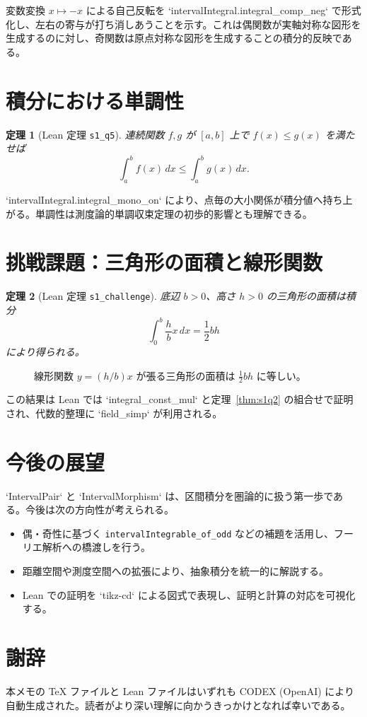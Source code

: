 \documentclass[luatex]{ltjsarticle}
\theoremstyle{definition}
\theoremstyle{plain}
\newtheorem{theorem}{定理}
\theoremstyle{remark}
\begin{document}
変数変換 \(x\mapsto -x\) による自己反転を `intervalIntegral.integral_comp_neg` で形式化し、左右の寄与が打ち消しあうことを示す。これは偶関数が実軸対称な図形を生成するのに対し、奇関数は原点対称な図形を生成することの積分的反映である。

\section{積分における単調性}
\begin{theorem}[Lean 定理 \texttt{s1\_q5}]
\label{thm:s1q5}
連続関数 \(f,g\) が \([a,b]\) 上で \(f(x)\le g(x)\) を満たせば
\[
\int_a^b f(x)\,dx \le \int_a^b g(x)\,dx.
\]
\end{theorem}

`intervalIntegral.integral_mono_on` により、点毎の大小関係が積分値へ持ち上がる。単調性は測度論的単調収束定理の初歩的影響とも理解できる。

\section{挑戦課題：三角形の面積と線形関数}
\begin{theorem}[Lean 定理 \texttt{s1\_challenge}]
\label{thm:challenge}
底辺 \(b>0\)、高さ \(h>0\) の三角形の面積は積分
\[
\int_{0}^{b} \frac{h}{b}x\,dx = \frac{1}{2} b h
\]
により得られる。
\end{theorem}

\begin{figure}[h]
\centering
{}
\caption{線形関数 \(y=(h/b)x\) が張る三角形の面積は \(\tfrac{1}{2}bh\) に等しい。}
\end{figure}

この結果は Lean では `integral_const_mul` と定理~\ref{thm:s1q2} の組合せで証明され、代数的整理に `field_simp` が利用される。

\section{今後の展望}
`IntervalPair` と `IntervalMorphism` は、区間積分を圏論的に扱う第一歩である。今後は次の方向性が考えられる。
\begin{itemize}
  \item 偶・奇性に基づく \texttt{intervalIntegrable\_of\_odd} などの補題を活用し、フーリエ解析への橋渡しを行う。
  \item 距離空間や測度空間への拡張により、抽象積分を統一的に解説する。
  \item Lean での証明を `tikz-cd` による図式で表現し、証明と計算の対応を可視化する。
\end{itemize}

\section*{謝辞}
本メモの TeX ファイルと Lean ファイルはいずれも CODEX (OpenAI) により自動生成された。読者がより深い理解に向かうきっかけとなれば幸いである。
\end{document}
